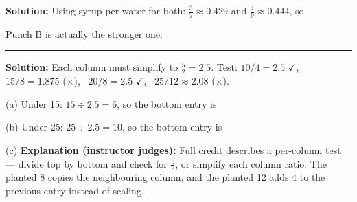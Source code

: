 \documentclass[12pt]{article}
\begin{document}
\textbf{Solution:} Using syrup per water for both: $\frac{3}{7} \approx 0.429$
and $\frac{4}{9} \approx 0.444$, so 

Punch B is actually the stronger one.

\vspace{0.3cm}\noindent\rule{\linewidth}{0.2pt}\vspace{0.3cm}


\textbf{Solution:} Each column must simplify to $\frac{5}{2} = 2.5$. Test:
$10/4 = 2.5$ $\checkmark$, \ $15/8 = 1.875$ ($\times$), \ $20/8 = 2.5$
$\checkmark$, \ $25/12 \approx 2.08$ ($\times$).

(a) Under 15: $15 \div 2.5 = 6$, so the bottom entry is 

(b) Under 25: $25 \div 2.5 = 10$, so the bottom entry is 

(c) \textbf{Explanation (instructor judges):} Full credit describes a per-column
test — divide top by bottom and check for $\frac{5}{2}$, or simplify each
column ratio. The planted 8 copies the neighbouring column, and the planted 12
adds 4 to the previous entry instead of scaling.
\end{document}
